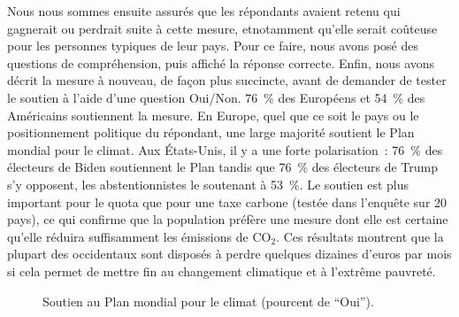 \documentclass[a5paper,french]{memoir}
\begin{document}
Nous nous sommes ensuite assurés que les répondants avaient retenu qui gagnerait ou perdrait suite à cette mesure, etnotamment qu'elle serait coûteuse pour les personnes typiques de leur pays. Pour ce faire, nous avons posé des questions de compréhension, puis affiché la réponse correcte. Enfin, nous avons décrit la mesure à nouveau, de façon plus succincte, avant de demander de tester le soutien à l'aide d'une question Oui/Non. 76~\% des Européens et 54~\% des Américains soutiennent la mesure. En Europe, quel que ce soit le pays ou le positionnement politique du répondant, une large majorité soutient le Plan mondial pour le climat. Aux États-Unis, il y a une forte polarisation~: 76~\% des électeurs de Biden soutiennent le Plan tandis que 76~\% des électeurs de Trump s'y opposent, les abstentionnistes le soutenant à 53~\%. Le soutien est plus important pour le quota que pour une taxe carbone (testée dans l'enquête sur 20 pays), ce qui confirme que la population préfère une mesure dont elle est certaine qu'elle réduira suffisamment les émissions de CO$_\text{2}$. Ces résultats montrent que la plupart des occidentaux sont disposés à perdre quelques dizaines d'euros par mois si cela permet de mettre fin au changement climatique et à l'extrême pauvreté. 

\begin{figure}[h!]
  \caption[Soutien au Plan mondial pour le climat]{Soutien au Plan mondial pour le climat (pourcent de ``Oui'').} 
  \label{fig:gcs_support} 
\end{figure}
\end{document}
